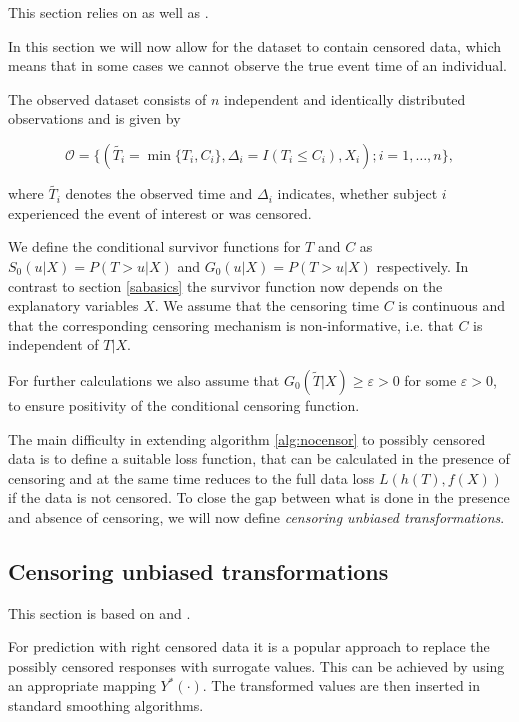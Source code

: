 \documentclass[12pt, a4paper]{article}
\theoremstyle{definition}
\theoremstyle{plain}
\numberwithin{equation}{section}
\numberwithin{figure}{section}
\numberwithin{table}{section}
\begin{document}
	This section relies on \citet*{basearticle} as well as \citet*{deeplbook}.
	
	In this section we will now allow for the dataset to contain censored data, which means that in some cases we cannot observe the true event time of an individual.
	
	The observed dataset consists of $n$ independent and identically distributed observations and is given by 
	
	\begin{equation*}
	\mathcal{O} = \{(\tilde{T_i} = \min \{T_i, C_i\}, \Delta_i = I(T_i \leq C_i), X_i); i = 1,\dots,n\},
	\end{equation*}
	 
	 where $\tilde{T_i}$ denotes the observed time and $\Delta_i$ indicates, whether subject $i$ experienced the event of interest or was censored.
	 
	 We define the conditional survivor functions for $T$ and $C$ as $S_0(u \vert X)=P(T>u \vert X)$ and $G_0(u \vert X)=P(T>u \vert X)$ respectively.
	 In contrast to section \ref{sabasics} the survivor function now depends on the explanatory variables $X$.
	 We assume that the censoring time $C$ is continuous and that the corresponding censoring mechanism is non-informative, i.e. that $C$ is independent of $T\vert X$.
	 
	 For further calculations we also assume that $G_0(\tilde{T} \vert X)\geq \varepsilon > 0$ for some $\varepsilon >0$, to ensure positivity of the conditional censoring function.
	
	The main difficulty in extending algorithm \ref{alg:nocensor} to possibly censored data is to define a suitable loss function, that can be calculated in the presence of censoring and at the same time reduces to the full data loss $L(h(T), f(X))$ if the data is not censored.
	To close the gap between what is done in the presence and absence of censoring, we will now define \textit{censoring unbiased transformations}.
	
	\subsection{Censoring unbiased transformations}\label{sec:drtrafo}
	This section is based on \citet*{culs} and \citet*{drcut}.
	
	
	For prediction with right censored data it is a popular approach to replace the possibly censored responses with surrogate values.
	This can be achieved by using an appropriate mapping $Y^*(\cdot)$.
	The transformed values are then inserted in standard smoothing algorithms.
	
\end{document}
